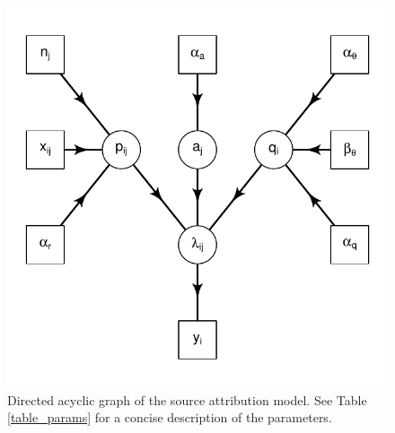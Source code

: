 \begin{knitrout}
\color{fgcolor}\begin{figure}[H]

{\centering \includegraphics[width=\maxwidth]{DAG-1} 

}

\caption{Directed acyclic graph of the source attribution model. See Table \ref{table_params} for a concise description of the parameters.}
\label{fig:DAG}
\end{figure}
\end{knitrout}

